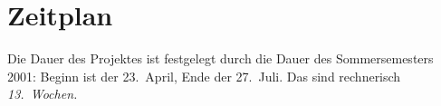 
\section{Zeitplan}
\label{sec:zeitplan}


Die Dauer des Projektes ist festgelegt durch die Dauer des Sommersemesters
2001: Beginn ist der 23.\ April, Ende der 27.\ Juli. Das sind rechnerisch
\emph{13.\ Wochen.}







